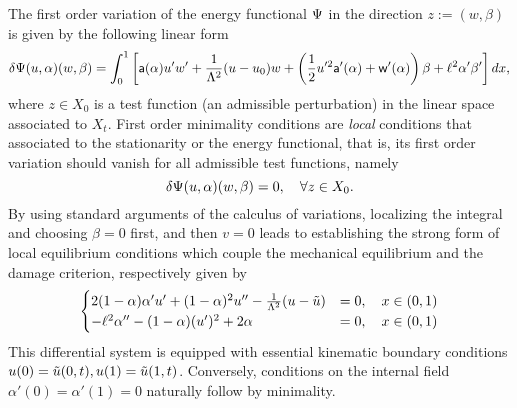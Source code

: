 The first order variation of the energy functional $\Psi$ in the direction $z:=(w, \beta)$ is given by the following linear form  
\begin{equation}
    \delta \Psi(u,\alpha)(w,\beta)=\int_0^1
\left[\mathsf{a}(\alpha)u'w'+\frac{1}{\Lambda^2} (u-u_0) w+ \left( \frac{1}{2}u'^2 \mathsf{a}'(\alpha)+\mathsf{w}'(\alpha) \right)\beta+\ell^2\alpha'\beta' \right]dx,\label{firstvar1}
\end{equation}
where 
$z\in X_0$ is a test function (an admissible perturbation) in the linear space associated to $X_t$. First order minimality conditions are \emph{local} conditions that associated to the stationarity or the energy functional, that is, its first order variation should vanish for all admissible test functions, namely
\begin{equation}
    \label{eq:stationarity}
    \delta \Psi(u,\alpha)(w,\beta)=0, \quad \forall z\in X_0.
\end{equation}
By using standard arguments of the calculus of variations, localizing the integral and choosing $\beta = 0$ first, and then $v =0$ leads to establishing the strong form of local equilibrium conditions which couple the mechanical equilibrium and the damage criterion, respectively given by
\begin{eqnarray}
\begin{cases}
  2(1-\alpha)\alpha' u' +(1-\alpha)^2 u'' -  \frac{1}{\Lambda^2}(u-\tilde u) &= 0, \quad {x\in (0, 1)}\\
  -\ell^2\alpha'' - (1-\alpha)( u')^2 + 2\alpha   &= 0, \quad {x\in (0, 1)}
\end{cases}
\label{auto1}
\end{eqnarray}
This differential system is equipped with essential kinematic boundary conditions $u(0) = \tilde u(0, t), u(1) = \tilde u(1, t)$. Conversely, conditions on the internal field $\alpha'(0)=\alpha'(1)=0$ naturally follow by minimality.
